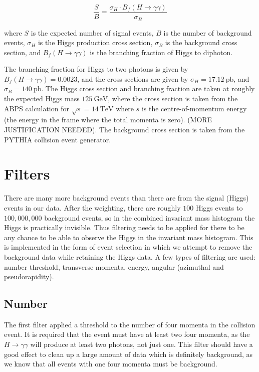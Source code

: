 \documentclass[11pt]{amsart}
\begin{document}
\begin{multicols}{2}
\begin{equation}
  \label{eq:weighting}
  \frac{S}{B} = \frac{\sigma_H \cdot B_f\left(H\to\gamma\gamma\right)}{\sigma_B}
\end{equation}

where $S$ is the expected number of signal events, $B$ is the number of background events, $\sigma_H$ is the Higgs production cross section, $\sigma_B$ is the background cross section, and $B_f\left(H\to\gamma\gamma\right)$ is the branching fraction of Higgs to diphoton.

The branching fraction for Higgs to two photons is given by $B_f\left(H\to\gamma\gamma\right) = 0.0023$, and the cross sections are given by $\sigma_H = \SI{17.12}{\pico\barn}$, and $\sigma_B = \SI{140}{\pico\barn}$. The Higgs cross section and branching fraction are taken at roughly the expected Higgs mass $\SI{125}{\giga\electronvolt}$, \cite{Higgs} where the cross section is taken from the ABPS calculation for $\sqrt{s} = \SI{14}{\tera\electronvolt}$ where $s$ is the centre-of-momentum energy (the energy in the frame where the total momenta is zero). \cite{HiggsCross1} \cite{COMframe} (MORE JUSTIFICATION NEEDED). The background cross section is taken from the PYTHIA collision event generator.

\section{Filters}
\label{sec:filters}

There are many more background events than there are from the signal (Higgs) events in our data. After the weighting, there are roughly $100$ Higgs events to $100,000,000$ background events, so in the combined invariant mass histogram the Higgs is practically invisible. Thus filtering needs to be applied for there to be any chance to be able to observe the Higgs in the invariant mass histogram. This is implemented in the form of event selection in which we attempt to remove the background data while retaining the Higgs data. A few types of filtering are used: number threshold, transverse momenta, energy, angular (azimuthal and pseudorapidity).

\subsection{Number}

The first filter applied a threshold to the number of four momenta in the collision event. It is required that the event must have at least two four momenta, as the $H \to \gamma\gamma$ will produce at least two photons, not just one. This filter should have a good effect to clean up a large amount of data which is definitely background, as we know that all events with one four momenta must be background.


\end{multicols}
\end{document}
